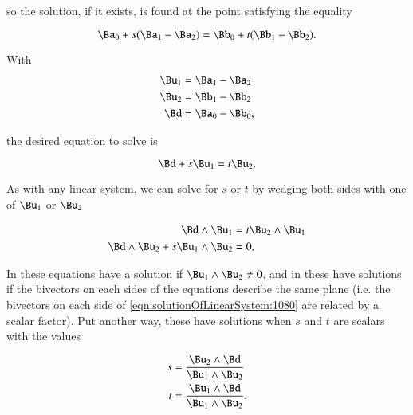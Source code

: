 so the solution, if it exists, is found at the point satisfying the equality

\begin{dmath}\label{eqn:solutionOfLinearSystem:1020}
\Ba_0 + s( \Ba_1 - \Ba_2 ) = \Bb_0 + t( \Bb_1 - \Bb_2 ).
\end{dmath}

With
\begin{dmath}\label{eqn:solutionOfLinearSystem:1040}
\begin{aligned}
\Bu_1 &= \Ba_1 - \Ba_2 \\
\Bu_2 &= \Bb_1 - \Bb_2 \\
\Bd &= \Ba_0 - \Bb_0,
\end{aligned}
\end{dmath}

the desired equation to solve is

\begin{dmath}\label{eqn:solutionOfLinearSystem:1060}
\Bd + s \Bu_1 = t \Bu_2.
\end{dmath}

As with any linear system, we can
solve for \( s \) or \( t \) by
wedging both sides with one of \( \Bu_1 \) or \( \Bu_2 \)

\begin{dmath}\label{eqn:solutionOfLinearSystem:1080}
\begin{aligned}
\Bd \wedge \Bu_1 &= t \Bu_2 \wedge \Bu_1 \\
\Bd \wedge \Bu_2 + s \Bu_1 \wedge \Bu_2 &= 0,
\end{aligned}
\end{dmath}

In  these equations have a solution if \( \Bu_1 \wedge \Bu_2 \ne 0 \), and in  these have solutions if the bivectors on each sides of the equations describe the same plane (i.e. the bivectors on each side of \cref{eqn:solutionOfLinearSystem:1080} are related by a scalar factor).
Put another way, these have solutions when \( s \) and \( t \) are scalars with the values

\begin{dmath}\label{eqn:solutionOfLinearSystem:1100}
\begin{aligned}
s &= \frac{\Bu_2 \wedge \Bd}{\Bu_1 \wedge \Bu_2} \\
t &= \frac{\Bu_1 \wedge \Bd}{\Bu_1 \wedge \Bu_2}.
\end{aligned}
\end{dmath}

